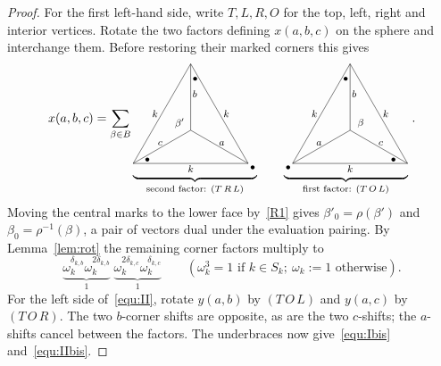 \documentclass{amsart}
\begin{document}
\begin{proof}
For the first left-hand side, write $T,L,R,O$ for the top, left, right and
interior vertices. Rotate the two factors defining $x(a,b,c)$ on the sphere
and interchange them. Before restoring their marked corners this gives
\[
x(a,b,c)=\sum_{\beta\in B}
\underbrace{\vcenter{\hbox{\scalebox{.89}{\begin{tikzpicture}[scale=1.40,font=\small,inner sep=1.5pt]
\coordinate (L) at (0,0); \coordinate (R) at (2.6,0);
\coordinate (T) at (1.3,2.25); \coordinate (O) at (1.3,.75);
\draw (L)--node[midway,below] {$k$}(R)--node[midway,right=2pt] {$k$}(T)
 --node[midway,left=2pt] {$k$}cycle;
\draw (O)--node[pos=.48,above left=-1pt] {$c$}(L);
\draw (O)--node[pos=.55,right] {$b$}(T);
\draw (O)--node[pos=.48,above right=-1pt] {$a$}(R);

\node at (1.40,1.91) {$\bullet$}; \node[below right] at (R) {$\bullet$};
\node at (.32,.08) {$\bullet$}; \node at (1.05,.91) {$\beta'$};\end{tikzpicture}}}}}_{\text{second factor: }(T\,R\,L)}\qquad\underbrace{\vcenter{\hbox{\scalebox{.89}{\begin{tikzpicture}[scale=1.40,font=\small,inner sep=1.5pt]
\coordinate (L) at (0,0); \coordinate (R) at (2.6,0);
\coordinate (T) at (1.3,2.25); \coordinate (O) at (1.3,.75);
\draw (L)--node[midway,below] {$k$}(R)--node[midway,right=2pt] {$k$}(T)
 --node[midway,left=2pt] {$k$}cycle;
\draw (O)--node[pos=.48,above left=-1pt] {$a$}(L);
\draw (O)--node[pos=.55,right] {$b$}(T);
\draw (O)--node[pos=.48,above right=-1pt] {$c$}(R);

\node at (1.20,1.91) {$\bullet$}; \node[below left] at (L) {$\bullet$};
\node at (2.28,.08) {$\bullet$}; \node at (1.54,.91) {$\beta$};\end{tikzpicture}}}}}_{\text{first factor: }(T\,O\,L)}\,.
\]
Moving the central marks to the lower face by~\eqref{R1} gives
$\beta'_0=\rho(\beta')$ and $\beta_0=\rho^{-1}(\beta)$,
a pair of vectors dual under the evaluation pairing. By Lemma~\ref{lem:rot} the remaining
corner factors multiply to
\[
 \underbrace{\omega_k^{\delta_{k,b}}\omega_k^{2\delta_{k,b}}}_{1}
 \;\underbrace{\omega_k^{2\delta_{k,c}}\omega_k^{\delta_{k,c}}}_{1}
 \qquad (\omega_k^3=1\text{ if }k\in S_k;
             \ \omega_k:=1\text{ otherwise}).
\]
For the left side of~\eqref{equ:II}, rotate $y(a,b)$ by $(T\,O\,L)$
and $y(a,c)$ by $(T\,O\,R)$. The two $b$-corner shifts are opposite,
as are the two $c$-shifts; the $a$-shifts cancel between the factors.
The underbraces now give~\eqref{equ:Ibis} and~\eqref{equ:IIbis}.


\end{proof}
\end{document}
